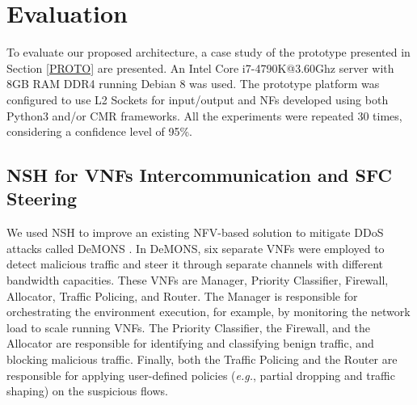 \section{Evaluation}

To evaluate our proposed architecture, a case study of the prototype presented in Section \ref{PROTO} are presented. An Intel Core i7-4790K@3.60Ghz server with 8GB RAM DDR4 running Debian 8 was used. The prototype platform was configured to use L2 Sockets for input/output and NFs developed using both Python3 and/or CMR frameworks. All the experiments were repeated 30 times, considering a confidence level of 95\%.


\subsection{NSH for VNFs Intercommunication and SFC Steering}

We used NSH to improve an existing NFV-based solution to mitigate DDoS attacks called DeMONS \cite{Garcia-2018}. In DeMONS, six separate VNFs were employed to detect malicious traffic and steer it through separate channels with different bandwidth capacities. These VNFs are Manager, Priority Classifier, Firewall, Allocator, Traffic Policing, and Router. The Manager is responsible for orchestrating the environment execution, for example, by monitoring the network load to scale running VNFs. The Priority Classifier, the Firewall, and the Allocator are responsible for identifying and classifying benign traffic, and blocking malicious traffic. Finally, both the Traffic Policing and the Router are responsible for applying user-defined policies (\textit{e.g.}, partial dropping and traffic shaping) on the suspicious flows.

